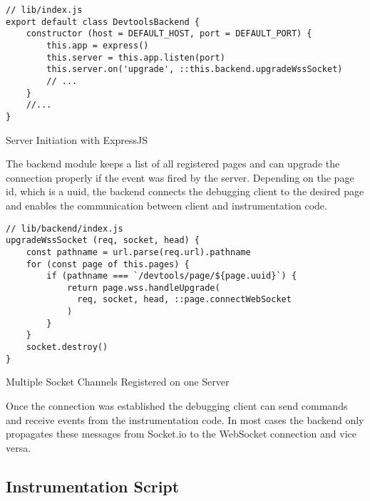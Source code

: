 \begin{listing}[H]
\begin{verbatim}
// lib/index.js
export default class DevtoolsBackend {
    constructor (host = DEFAULT_HOST, port = DEFAULT_PORT) {
        this.app = express()
        this.server = this.app.listen(port)
        this.server.on('upgrade', ::this.backend.upgradeWssSocket)
        // ...
    }
    //...
}
\end{verbatim}
\caption{Server Initiation with ExpressJS}
\label{lst:socketUpgrade}
\end{listing}

The backend module keeps a list of all registered pages and can upgrade the connection properly if the event was fired by the server. Depending on the page id, which is a uuid, the backend connects the debugging client to the desired page and enables the communication between client and instrumentation code.

\begin{listing}[H]
\begin{verbatim}
// lib/backend/index.js
upgradeWssSocket (req, socket, head) {
    const pathname = url.parse(req.url).pathname
    for (const page of this.pages) {
        if (pathname === `/devtools/page/${page.uuid}`) {
            return page.wss.handleUpgrade(
              req, socket, head, ::page.connectWebSocket
            )
        }
    }
    socket.destroy()
}
\end{verbatim}
\caption{Multiple Socket Channels Registered on one Server}
\label{lst:socket}
\end{listing}

Once the connection was established the debugging client can send commands and receive events from the instrumentation code. In most cases the backend only propagates these messages from Socket.io to the WebSocket connection and vice versa.

\subsection{Instrumentation Script}

